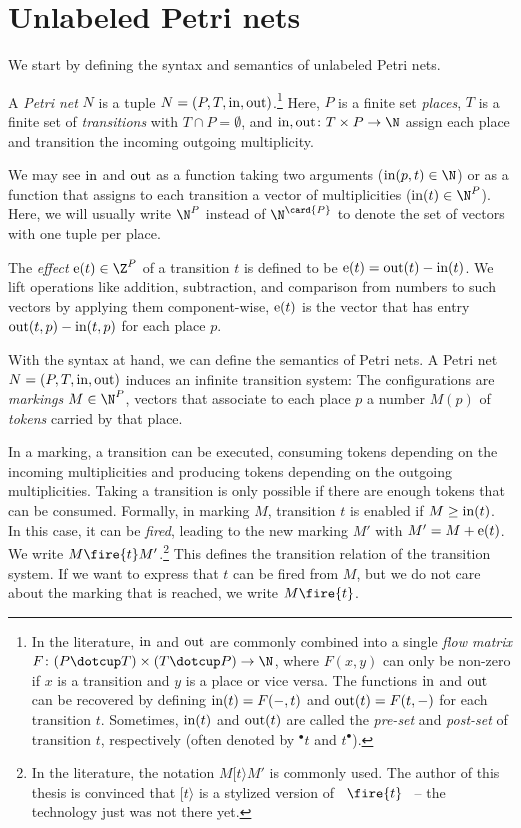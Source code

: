 \documentclass[../../diss.tex]{subfiles}
\begin{document}
\section{Unlabeled Petri nets}%
\label{Section:PNUnlabeled}%

We start by defining the syntax and semantics of unlabeled Petri nets.

    A \emph{Petri net} $N$ is a tuple $N = (P, T, \text{in}, \text{out})$.\footnote[1]{In the literature, $\text{in}$ and $\text{out}$ are commonly combined into a single \emph{flow matrix} $F \colon (P \dotcup T) \times (T \dotcup P) \to \N$, where $F(x,y)$ can only be non-zero if $x$ is a transition and $y$ is a place or vice versa.
        The functions $\text{in}$ and $\text{out}$ can be recovered by defining $\text{in}(t) = F(-,t)$ and $\text{out}(t) = F(t,-)$ for each transition $t$.
        Sometimes, $\text{in}(t)$ and $\text{out}(t)$ are called the \emph{pre-set} and \emph{post-set} of transition $t$, respectively (often denoted by ${}^\bullet t$ and $t^\bullet$).
    }
    Here, $P$ is a finite set \emph{places}, $T$ is a finite set of \emph{transitions} with $T \cap P = \emptyset$, and $\i, \o \colon T \times P \to \N$ assign each place and transition the incoming \resp outgoing multiplicity.

We may see $\text{in}$ and $\text{out}$ as a function taking two arguments (\eg $\i(p,t) \in \N$) or as a function that assigns to each transition a vector of multiplicities (\eg $\i(t) \in \N^P$).
Here, we will usually write $\N^P$ instead of $\N^{\card{P}}$ to denote the set of vectors with one tuple per place.

The \emph{effect} $\e(t) \in \Z^P$ of a transition $t$ is defined to be $\text{e}(t) = \text{out}(t) - \text{in}(t)$.
We lift operations like addition, subtraction, and comparison from numbers to such vectors by applying them component-wise, \eg $\text{e}(t)$ is the vector that has entry $\text{out}(t,p) - \text{in}(t,p)$ for each place $p$.

With the syntax at hand, we can define the semantics of Petri nets.
A Petri net $N = (P,T,\text{in},\text{out})$ induces an infinite transition system:
The configurations are \emph{markings} $M \in \N^P$, vectors that associate to each place $p$ a number $M(p)$ of \emph{tokens} carried by that place.

In a marking, a transition can be executed, consuming tokens depending on the incoming multiplicities and producing tokens depending on the outgoing multiplicities.
Taking a transition is only possible if there are enough tokens that can be consumed.
Formally, in marking $M$, transition $t$ is enabled if $M \geq \text{in}(t)$.
In this case, it can be \emph{fired}, leading to the new marking $M'$ with $M' = M + \text{e}(t)$.
We write $M \fire{t} M'$.\footnote{In the literature, the notation $M [t\rangle M'$ is commonly used.
    The author of this thesis is convinced that $[t\rangle$ is a stylized version of \, $\fire{t}$ \, -- the technology just was not there yet.
}
This defines the transition relation of the transition system.
If we want to express that $t$ can be fired from $M$, but we do not care about the marking that is reached, we write $M \fire{t}$.
\end{document}
